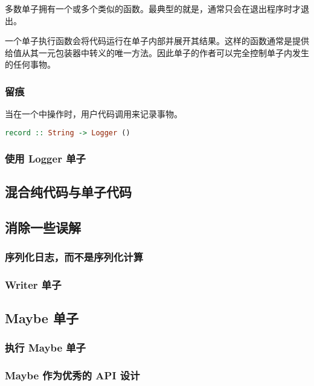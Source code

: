 \documentclass[./main.tex]{subfiles}
\begin{document}
多数单子拥有一个或多个类似的函数。最典型的就是，通常只会在退出程序时才退出。

一个单子执行函数会将代码运行在单子内部并展开其结果。这样的函数通常是提供给值从其一元包装器中转义的唯一方法。因此单子的作者可以完全控制单子内发生的任何事物。

\subsubsection*{留痕}

当在一个中操作时，用户代码调用来记录事物。

\begin{lstlisting}[language=Haskell]
  record :: String -> Logger ()
\end{lstlisting}

\subsubsection*{使用 Logger 单子}

\subsection*{混合纯代码与单子代码}

\subsection*{消除一些误解}

\subsubsection*{序列化日志，而不是序列化计算}

\subsubsection*{Writer 单子}

\subsection*{Maybe 单子}

\subsubsection*{执行 Maybe 单子}

\subsubsection*{Maybe 作为优秀的 API 设计}
\end{document}
